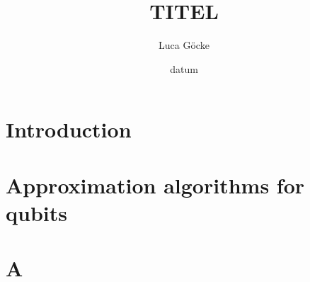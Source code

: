 \documentclass[pstricks,siunitx,theorem,british]{tumphthesis}
\title{TITEL}
\author{Luca Göcke}
\date{datum}
\begin{document}

\frontmatter
\maketitle
\tableofcontents

\mainmatter
\chapter{Introduction}



\chapter{Approximation algorithms for qubits}

\appendix
\chapter{A}

\backmatter
\printbibliography
\end{document}
